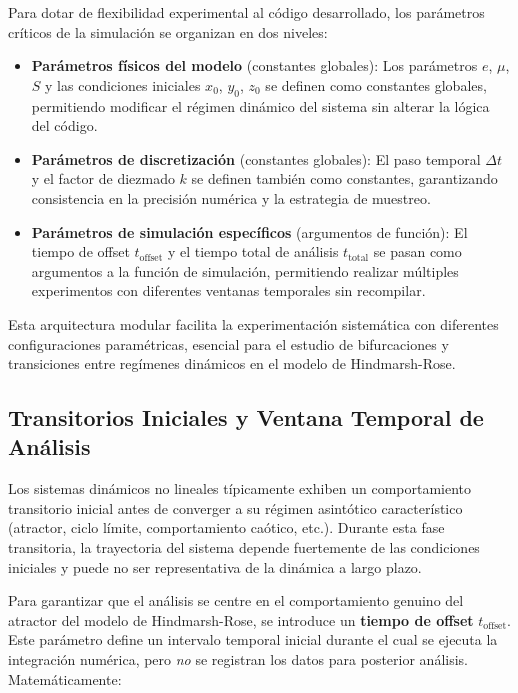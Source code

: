 \documentclass{article}
\begin{document}
Para dotar de flexibilidad experimental al código desarrollado, los parámetros críticos de la simulación se organizan en dos niveles:

\begin{itemize}
    \item \textbf{Parámetros físicos del modelo} (constantes globales): Los parámetros $e$, $\mu$, $S$ y las condiciones iniciales $x_0$, $y_0$, $z_0$ se definen como constantes globales, permitiendo modificar el régimen dinámico del sistema sin alterar la lógica del código.
    
    \item \textbf{Parámetros de discretización} (constantes globales): El paso temporal $\Delta t$ y el factor de diezmado $k$ se definen también como constantes, garantizando consistencia en la precisión numérica y la estrategia de muestreo.
    
    \item \textbf{Parámetros de simulación específicos} (argumentos de función): El tiempo de offset $t_{\text{offset}}$ y el tiempo total de análisis $t_{\text{total}}$ se pasan como argumentos a la función de simulación, permitiendo realizar múltiples experimentos con diferentes ventanas temporales sin recompilar.
\end{itemize}

Esta arquitectura modular facilita la experimentación sistemática con diferentes configuraciones paramétricas, esencial para el estudio de bifurcaciones y transiciones entre regímenes dinámicos en el modelo de Hindmarsh-Rose.

\subsection{Transitorios Iniciales y Ventana Temporal de Análisis}

Los sistemas dinámicos no lineales típicamente exhiben un comportamiento transitorio inicial antes de converger a su régimen asintótico característico (atractor, ciclo límite, comportamiento caótico, etc.). Durante esta fase transitoria, la trayectoria del sistema depende fuertemente de las condiciones iniciales y puede no ser representativa de la dinámica a largo plazo.

Para garantizar que el análisis se centre en el comportamiento genuino del atractor del modelo de Hindmarsh-Rose, se introduce un \textbf{tiempo de offset} $t_{\text{offset}}$. Este parámetro define un intervalo temporal inicial durante el cual se ejecuta la integración numérica, pero \textit{no} se registran los datos para posterior análisis. Matemáticamente:
\end{document}
